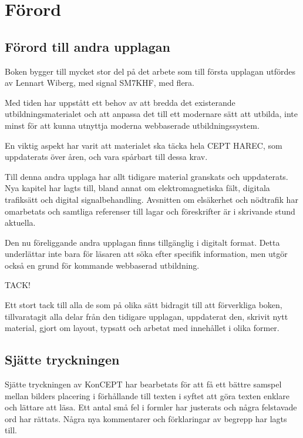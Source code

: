 \chapter*{Förord}

\balance

\section*{Förord till andra upplagan}

Boken bygger till mycket stor del på det arbete som till första upplagan
utfördes av Lennart Wiberg, med signal SM7KHF, med flera.

Med tiden har uppstått ett behov av att bredda det existerande
utbildningsmaterialet och att anpassa det till ett modernare sätt att utbilda,
inte minst för att kunna utnyttja moderna webbaserade utbildningssystem.

En viktig aspekt har varit att materialet ska täcka hela CEPT HAREC,
som uppdaterats över åren, och vara spårbart till dessa krav.

Till denna andra upplaga har allt tidigare material granskats och uppdaterats.
Nya kapitel har lagts till, bland annat om elektromagnetiska fält, digitala
trafiksätt och digital signalbehandling.
Avsnitten om elsäkerhet och nödtrafik har omarbetats och samtliga referenser
till lagar och föreskrifter är i skrivande stund aktuella.

Den nu föreliggande andra upplagan finns tillgänglig i digitalt format.
Detta underlättar inte bara för läsaren att söka efter specifik information,
men utgör också en grund för kommande webbaserad utbildning.

TACK!

Ett stort tack till alla de som på olika sätt bidragit till att förverkliga
boken, tillvaratagit alla delar från den tidigare upplagan, uppdaterat
den, skrivit nytt material, gjort om layout, typsatt och arbetat med
innehållet i olika former.

\section*{Sjätte tryckningen}

Sjätte tryckningen av KonCEPT har bearbetats för att få ett bättre samspel mellan
bilders placering i förhållande till texten i syftet att göra texten enklare och
lättare att läsa.
Ett antal små fel i formler har justerats och några felstavade ord har rättats.
Några nya kommentarer och förklaringar av begrepp har lagts till.

